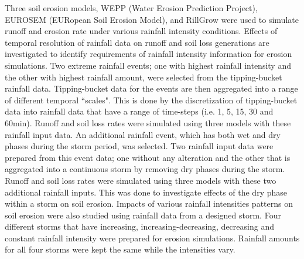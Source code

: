 Three soil erosion models, WEPP (Water Erosion Prediction Project), EUROSEM
(EURopean Soil Erosion Model), and RillGrow were used to simulate runoff and
erosion rate under various rainfall intensity conditions. Effects of temporal
resolution of rainfall data on runoff and soil loss generations are investigated
to identify requirements of rainfall intensity information for erosion
simulations. Two extreme rainfall events; one with highest rainfall intensity
and the other with highest rainfall amount, were selected from the
tipping-bucket rainfall data. Tipping-bucket data for the events are then
aggregated into a range of different temporal ``scales". This is done by the
discretization of tipping-bucket data into rainfall data that have a range of
time-steps (i.e. 1, 5, 15, 30 and 60min).
Runoff and soil loss rates were simulated using three models with these rainfall
input data. An additional rainfall event, which has both wet and dry phases
during the storm period, was selected. Two rainfall input data were prepared
from this event data; one without any alteration and the other that is
aggregated into a continuous storm by removing dry phases during the storm.
Runoff and soil loss rates were simulated using three models with these two
additional rainfall inputs. This was done to investigate effects of the dry
phase within a storm on soil erosion. Impacts of various rainfall intensities
patterns on soil erosion were also studied using rainfall data from a designed
storm. Four different storms that have increasing, increasing-decreasing,
decreasing and constant rainfall intensity were prepared for erosion
simulations. Rainfall amounts for all four storms were kept the same while the
intensities vary.

